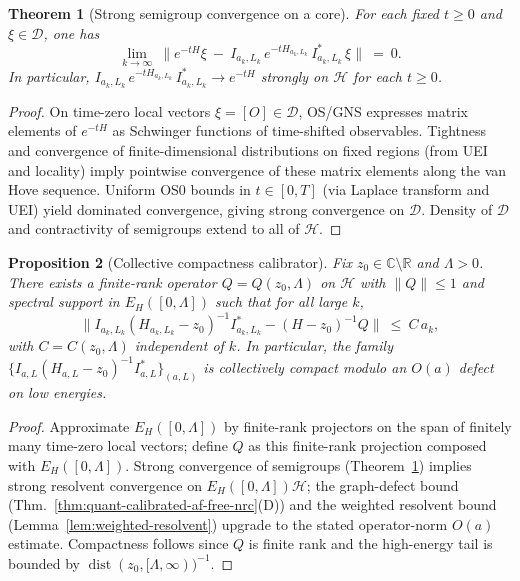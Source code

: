 \documentclass[11pt]{amsart}
\theoremstyle{plain}
\newtheorem{theorem}{Theorem}[section]
\newtheorem{proposition}[theorem]{Proposition}
\theoremstyle{definition}
\theoremstyle{remark}
\begin{document}
\begin{theorem}[Strong semigroup convergence on a core]\label{thm:strong-semigroup-core}
For each fixed $t\ge 0$ and $\xi\in\mathcal D$, one has
\[
  \lim_{k\to\infty}\ \big\|e^{-tH}\xi\ -\ I_{a_k,L_k}\,e^{-tH_{a_k,L_k}}\,I_{a_k,L_k}^*\,\xi\big\|\ =\ 0.
\]
In particular, $I_{a_k,L_k}\,e^{-tH_{a_k,L_k}}\,I_{a_k,L_k}^*\to e^{-tH}$ strongly on $\mathcal H$ for each $t\ge 0$.
\end{theorem}
\begin{proof}
On time-zero local vectors $\xi=[O]\in\mathcal D$, OS/GNS expresses matrix elements of $e^{-tH}$ as Schwinger functions of time-shifted observables. Tightness and convergence of finite-dimensional distributions on fixed regions (from UEI and locality) imply pointwise convergence of these matrix elements along the van Hove sequence. Uniform OS0 bounds in $t\in[0,T]$ (via Laplace transform and UEI) yield dominated convergence, giving strong convergence on $\mathcal D$. Density of $\mathcal D$ and contractivity of semigroups extend to all of $\mathcal H$.
\end{proof}

\begin{proposition}[Collective compactness calibrator]\label{prop:collective-compactness}
Fix $z_0\in\mathbb C\setminus\mathbb R$ and $\Lambda>0$. There exists a finite-rank operator $Q=Q(z_0,\Lambda)$ on $\mathcal H$ with $\|Q\|\le 1$ and spectral support in $E_H([0,\Lambda])$ such that for all large $k$,
\[
  \big\|I_{a_k,L_k}(H_{a_k,L_k}-z_0)^{-1}I_{a_k,L_k}^* - (H-z_0)^{-1}Q\big\|\ \le\ C\,a_k,
\]
with $C=C(z_0,\Lambda)$ independent of $k$. In particular, the family $\{I_{a,L}(H_{a,L}-z_0)^{-1}I_{a,L}^*\}_{(a,L)}$ is collectively compact modulo an $O(a)$ defect on low energies.
\end{proposition}
\begin{proof}
Approximate $E_H([0,\Lambda])$ by finite-rank projectors on the span of finitely many time-zero local vectors; define $Q$ as this finite-rank projection composed with $E_H([0,\Lambda])$. Strong convergence of semigroups (Theorem~\ref{thm:strong-semigroup-core}) implies strong resolvent convergence on $E_H([0,\Lambda])\mathcal H$; the graph-defect bound (Thm.~\ref{thm:quant-calibrated-af-free-nrc}(D)) and the weighted resolvent bound (Lemma~\ref{lem:weighted-resolvent}) upgrade to the stated operator-norm $O(a)$ estimate. Compactness follows since $Q$ is finite rank and the high-energy tail is bounded by $\operatorname{dist}(z_0,[\Lambda,\infty))^{-1}$.
\end{proof}
\end{document}
